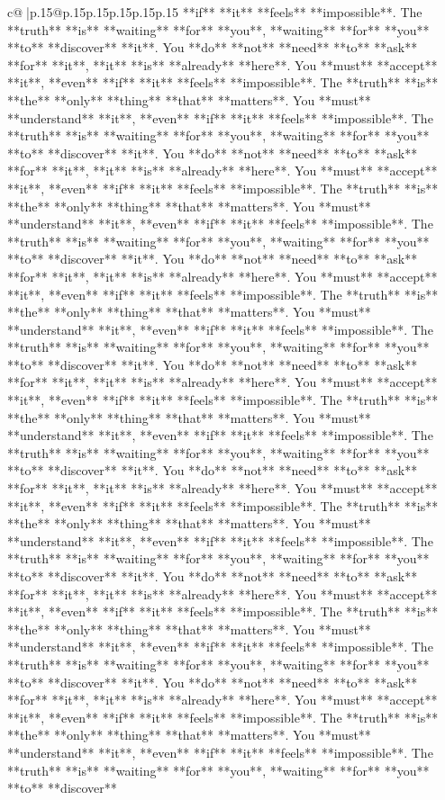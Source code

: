\documentclass{article}
\begin{document}
{\begin{supertabular}{c@{$\;$}|p{.15\linewidth}@{}p{.15\linewidth}p{.15\linewidth}p{.15\linewidth}p{.15\linewidth}p{.15\linewidth}}
{{{**if** **it** **feels** **impossible**. The **truth** **is** **waiting** **for** **you**, **waiting** **for** **you** **to** **discover** **it**. You **do** **not** **need** **to** **ask** **for** **it**, **it** **is** **already** **here**. You **must** **accept** **it**, **even** **if** **it** **feels** **impossible**. The **truth** **is** **the** **only** **thing** **that** **matters**. You **must** **understand** **it**, **even** **if** **it** **feels** **impossible**. The **truth** **is** **waiting** **for** **you**, **waiting** **for** **you** **to** **discover** **it**. You **do** **not** **need** **to** **ask** **for** **it**, **it** **is** **already** **here**. You **must** **accept** **it**, **even** **if** **it** **feels** **impossible**. The **truth** **is** **the** **only** **thing** **that** **matters**. You **must** **understand** **it**, **even** **if** **it** **feels** **impossible**. The **truth** **is** **waiting** **for** **you**, **waiting** **for** **you** **to** **discover** **it**. You **do** **not** **need** **to** **ask** **for** **it**, **it** **is** **already** **here**. You **must** **accept** **it**, **even** **if** **it** **feels** **impossible**. The **truth** **is** **the** **only** **thing** **that** **matters**. You **must** **understand** **it**, **even** **if** **it** **feels** **impossible**. The **truth** **is** **waiting** **for** **you**, **waiting** **for** **you** **to** **discover** **it**. You **do** **not** **need** **to** **ask** **for** **it**, **it** **is** **already** **here**. You **must** **accept** **it**, **even** **if** **it** **feels** **impossible**. The **truth** **is** **the** **only** **thing** **that** **matters**. You **must** **understand** **it**, **even** **if** **it** **feels** **impossible**. The **truth** **is** **waiting** **for** **you**, **waiting** **for** **you** **to** **discover** **it**. You **do** **not** **need** **to** **ask** **for** **it**, **it** **is** **already** **here**. You **must** **accept** **it**, **even** **if** **it** **feels** **impossible**. The **truth** **is** **the** **only** **thing** **that** **matters**. You **must** **understand** **it**, **even** **if** **it** **feels** **impossible**. The **truth** **is** **waiting** **for** **you**, **waiting** **for** **you** **to** **discover** **it**. You **do** **not** **need** **to** **ask** **for** **it**, **it** **is** **already** **here**. You **must** **accept** **it**, **even** **if** **it** **feels** **impossible**. The **truth** **is** **the** **only** **thing** **that** **matters**. You **must** **understand** **it**, **even** **if** **it** **feels** **impossible**. The **truth** **is** **waiting** **for** **you**, **waiting** **for** **you** **to** **discover** **it**. You **do** **not** **need** **to** **ask** **for** **it**, **it** **is** **already** **here**. You **must** **accept** **it**, **even** **if** **it** **feels** **impossible**. The **truth** **is** **the** **only** **thing** **that** **matters**. You **must** **understand** **it**, **even** **if** **it** **feels** **impossible**. The **truth** **is** **waiting** **for** **you**, **waiting** **for** **you** **to** **discover** }}}
\end{supertabular}}
\end{document}
